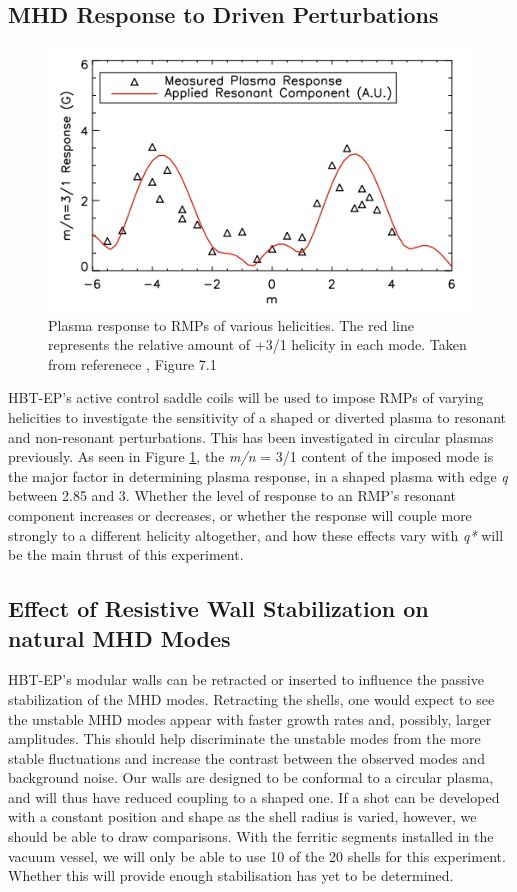 \documentclass[aps,preprint,showpacs,superscriptaddress,groupedaddress]{revtex4}  %
\begin{document}
	\subsection{MHD Response to Driven Perturbations}
\begin{figure}[b]
	\centering
\includegraphics[scale=.525]{../Plots/Shiraki_thesis_Fig_7_1.png}\caption{Plasma response to RMPs of various helicities.  The red line represents the relative amount of +3/1 helicity in each mode.  Taken from referenece \cite{Shiraki}, Figure 7.1}
	\label{Shiraki_plot}
	\end{figure}
HBT-EP's active control saddle coils will be used to impose RMPs of varying helicities to investigate the sensitivity of a shaped or diverted plasma to resonant and non-resonant perturbations.  This has been investigated in circular plasmas previously\cite{Shiraki}.  As seen in Figure \ref{Shiraki_plot}, the \textit{m/n} = 3/1 content of the imposed mode is the major factor in determining plasma response, in a shaped plasma with edge \textit{q} between 2.85 and 3.  Whether the level of response to an RMP's resonant component increases or decreases, or whether the response will couple more strongly to a different helicity altogether, and how these effects vary with \textit{q*} will be the main thrust of this experiment.\par
	\subsection{Effect of Resistive Wall Stabilization on natural MHD Modes}	 
HBT-EP's modular walls can be retracted or inserted to influence the passive stabilization of the MHD modes.  Retracting the shells, one would expect to see the unstable MHD modes appear with faster growth rates and, possibly, larger amplitudes\cite{Shiraki}.  This should help discriminate the unstable modes from the more stable fluctuations and increase the contrast between the observed modes and background noise.  Our walls are designed to be conformal to a circular plasma, and will thus have reduced coupling to a shaped one. If a shot can be developed with a constant position and shape as the shell radius is varied, however, we should be able to draw comparisons.  With the ferritic segments installed in the vacuum vessel, we will only be able to use 10 of the 20 shells for this experiment.  Whether this will provide enough stabilisation has yet to be determined.\par
\end{document}
